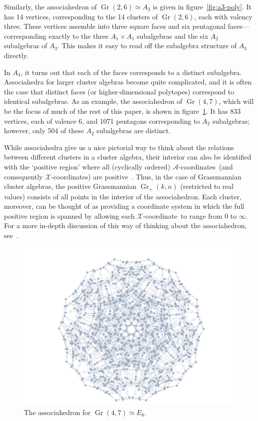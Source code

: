 \documentclass[12pt]{article}
\DeclareMathOperator{\Gr}{Gr}
\def\xcoord{$\mathcal{X}$-coordinate}
\def\xcoords{$\mathcal{X}$-coordinates}
\def\acoords{$\mathcal{A}$-coordinates}
\begin{document}
Similarly, the associahedron of $\Gr(2,6) \simeq A_3$ is given in figure~\ref{fig:a3-poly}. It has 14 vertices, corresponding to the 14 clusters of $\Gr(2,6)$, each with valency three. These vertices assemble into three square faces and six pentagonal faces---corresponding exactly to  the three $A_1 \times A_1$ subalgebras and the six $A_2$ subalgebras of $A_3$. This makes it easy to read off the subalgebra structure of $A_3$ directly. 

In $A_3$, it turns out that each of the faces corresponds to a distinct subalgebra. Associahedra for larger cluster algebras become quite complicated, and it is often the case that distinct faces (or higher-dimensional polytopes) correspond to identical subalgebras. As an example, the associahedron of $\Gr(4,7)$, which will be the focus of much of the rest of this paper, is shown in figure~\ref{fig:e6-poly}. It has 833 vertices, each of valence 6, and 1071 pentagons corresponding to $A_2$ subalgebras; however, only 504 of these $A_2$ subalgebras are distinct.

While associahedra give us a nice pictorial way to think about the relations between different clusters in a cluster algebra, their interior can also be identified with the `positive region' where all (cyclically ordered) \acoords\ (and consequently \xcoords) are positive~\cite{ArkaniHamed:2012nw,Drummond:2018dfd}. Thus, in the case of Grassmannian cluster algebras, the positive Grassmannian $\Gr_+(k,n)$ (restricted to real values) consists of all points in the interior of the associahedron. Each cluster, moreover, can be thought of as providing a coordinate system in which the full positive region is spanned by allowing each \xcoord\ to range from $0$ to $\infty$. For a more in-depth discussion of this way of thinking about the associahedron, see~\cite{Drummond:2018dfd}.

\begin{figure}[t]  \centering
  \includegraphics[scale=0.25]{e6-associahedron}
  \caption{The associahedron for $\Gr(4,7) \simeq E_6$.}
  \label{fig:e6-poly}
\end{figure}
\end{document}
